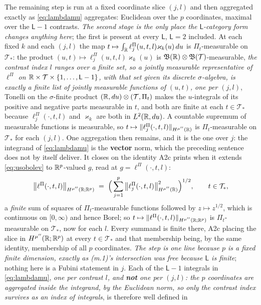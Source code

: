 The remaining step is run at a fixed coordinate slice $(j,l)$ and then aggregated exactly as
\eqref{eq:lambdamu} aggregates: Euclidean over the $p$ coordinates, maximal over the $\mathsf L-1$
contrasts. \emph{The second stage is the only place the $\mathsf L$-category form changes anything
here}; the first is present at every $\mathsf L$, $\mathsf L=2$ included. At each fixed $k$ and
each $(j,l)$ the map $t\mapsto\int_{\mathbb{R}}\ell^\Pi_j(u,t,l)\varkappa_k(u)\,du$ is $\Pi_t$-measurable
on $\mathcal T_\ast$: the product $(u,t)\mapsto\ell^\Pi_j(u,t,l)\varkappa_k(u)$ is
$\mathfrak B(\mathbb{R})\otimes\mathfrak B(\mathcal T)$-measurable, \emph{the contrast index $l$ ranges over
a finite set, so a jointly measurable representative of $\ell^\Pi$ on
$\mathbb{R}\times\mathcal T\times\{1,\dots,\mathsf L-1\}$, with that set given its discrete $\sigma$-algebra, is
exactly a finite list of jointly measurable functions of $(u,t)$, one per $(j,l)$}, Tonelli on the
$\sigma$-finite product
$(\mathbb{R},du)\otimes(\mathcal T,\Pi_t)$ makes the $u$-integrals of its positive and negative parts measurable
in $t$, and both are finite at each $t\in\mathcal T_\ast$ because $\ell^\Pi_j(\cdot,t,l)$ and $\varkappa_k$
are both in $L^{2}(\mathbb{R},du)$. A countable supremum of measurable functions is measurable, so
$t\mapsto\|\ell^\Pi_j(\cdot,t,l)\|_{H^{\mu''}(\mathbb{R})}$ is $\Pi_t$-measurable on $\mathcal T_\ast$ for each
$(j,l)$.
One aggregation then remains, and it is the one over $j$: the integrand of \eqref{eq:lambdamu} is
the \textbf{vector} norm, which the preceding sentence does not by itself deliver. It closes on the
identity A2c prints when it extends \eqref{eq:usobolev} to $\mathbb{R}^{p}$-valued $g$, read at
$g=\ell^\Pi(\cdot,t,l)$:
\[
\big\|\ell^\Pi(\cdot,t,l)\big\|_{H^{\mu''}(\mathbb{R};\mathbb{R}^{p})}
\;=\;\Big(\sum_{j=1}^{p}\big\|\ell^\Pi_j(\cdot,t,l)\big\|^{2}_{H^{\mu''}(\mathbb{R})}\Big)^{1/2},
\qquad t\in\mathcal T_\ast ,
\]
a \emph{finite} sum of squares of $\Pi_t$-measurable functions followed by $z\mapsto z^{1/2}$, which is
continuous on $[0,\infty)$ and hence Borel; so
$t\mapsto\|\ell^\Pi(\cdot,t,l)\|_{H^{\mu''}(\mathbb{R};\mathbb{R}^{p})}$ is $\Pi_t$-measurable on $\mathcal T_\ast$,
now for each $l$. Every summand is finite there, A2c placing the slice in $H^{\mu''}(\mathbb{R};\mathbb{R}^{p})$ at
every $t\in\mathcal T_\ast$ and that membership being, by the same identity, membership of all $p$
coordinates. \emph{The step is one line because $p$ is a fixed finite dimension, exactly as
\textup{(m.1)}'s intersection was free because $\mathsf L$ is finite}; nothing here is a Fubini
statement in $j$.
Each of the $\mathsf L-1$ integrals in \eqref{eq:lambdamu}, \emph{one per contrast $l$, and
\textbf{not} one per $(j,l)$: the $p$ coordinates are aggregated inside the integrand, by the Euclidean
norm, so only the contrast index survives as an index of integrals}, is therefore well defined in
